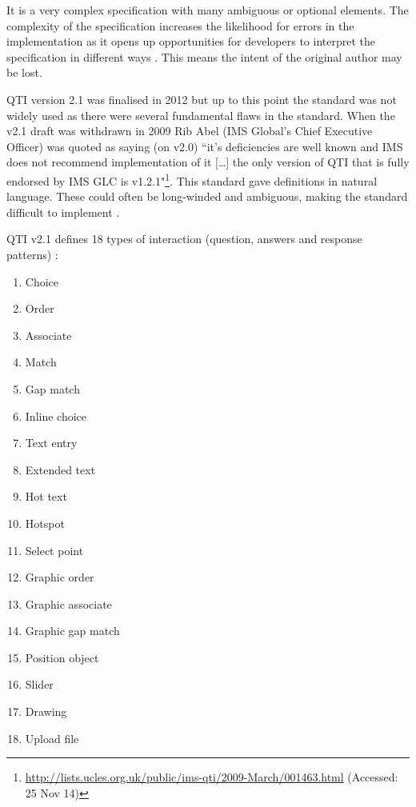 It is a very complex specification with many ambiguous or optional elements. The complexity of the specification increases the likelihood for errors in the implementation as it opens up opportunities for developers to interpret the specification in different ways \citep{failQTI}. This means the intent of the original author may be lost.

\gls{QTI} version 2.1 was finalised in 2012 \citep{qtiOverview} but up to this point the standard was not widely used \citep{eps265979} as there were several fundamental flaws in the standard. When the v2.1 draft was withdrawn in 2009 Rib Abel (IMS Global's Chief Executive Officer) was quoted as saying (on v2.0) ``it’s deficiencies are well known and IMS does not recommend implementation of it [\dots] the only version of QTI that is fully endorsed by IMS GLC is v1.2.1"\footnote{\url{http://lists.ucles.org.uk/public/ims-qti/2009-March/001463.html} (Accessed: 25 Nov 14)}. This standard gave definitions in natural language. These could often be long-winded and ambiguous, making the standard difficult to implement \citep{failQTI, Sclater2007}.

\gls{QTI} v2.1 defines 18 types of interaction (question, answers and response patterns) \citep{qtiImplementation}:
\begin{multicols}{3}
	\begin{enumerate}
		\item Choice
		\item Order
		\item Associate
		\item Match
		\item Gap match
		\item Inline choice
		\item Text entry
		\item Extended text
		\item Hot text
		\item Hotspot
		\item Select point
		\item Graphic order
		\item Graphic associate
		\item Graphic gap match
		\item Position object
		\item Slider
		\item Drawing
		\item Upload file
	\end{enumerate}
\end{multicols}

